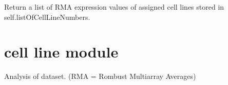 \documentclass[letterpaper,10pt,english]{sphinxmanual}
\begin{document}
\begin{fulllineitems}
\begin{fulllineitems}
\begin{quote}
\begin{description}
\end{description}\end{quote}

\end{fulllineitems}


\begin{fulllineitems}
\label{\detokenize{AssignmentPCA:AssignmentPCA.AssignmentPCA.readRMAExpressionAssigned}}
\sphinxAtStartPar
Return a list of RMA expression values of assigned cell lines stored 
in self.listOfCellLineNumbers.

\end{fulllineitems}


\end{fulllineitems}



\section{cell line module}
\label{\detokenize{CellLineRMAExpression:module-CellLineRMAExpression}}\label{\detokenize{CellLineRMAExpression:cell-line-module}}\label{\detokenize{CellLineRMAExpression::doc}}
\sphinxAtStartPar
Analysis of dataset. (RMA = Rombust Multi\sphinxhyphen{}array Averages)
\end{document}
